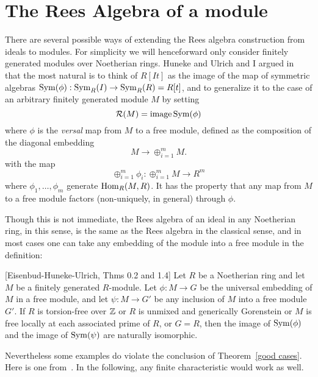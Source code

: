 \documentclass[twoside,12pt, leqno]{amsart}
\def\image{{\rm image}}
\def\RR{{\mathcal R}}
\begin{document}
\section{The Rees Algebra of a module} There are several possible ways of extending the Rees algebra construction from ideals to modules. For simplicity we will henceforward only consider finitely generated modules
over Noetherian rings. Huneke and Ulrich and I argued in~\cite{EHU} that the most natural is
to think of $R[It]$ as the image of the map of symmetric algebras
$\operatorname{Sym}(\phi): \operatorname{Sym}_R(I) \to \operatorname{Sym}_R(R) = R[t]$, and to generalize it to the case of
an arbitrary finitely generated module $M$ by setting
$$
\RR(M) = \image \Sym(\phi)
$$ 
where $\phi$ is the \emph{versal} map from $M$ to a free module, defined as 
the composition of 
the diagonal 
embedding 
$$
M \to \oplus_{i=1}^m M.
$$
with the map
$$
\oplus_{i=1}^m\phi_i: \oplus_{i=1}^mM \to R^{m}
$$ 
where
$\phi_1,\dots, \phi_m$ generate $\operatorname{Hom}_R(M,R)$.
It has the property that any map from $M$ to a free module factors (non-uniquely, in general) through $\phi$. 

Though this is not immediate, the Rees algebra of an ideal in any Noetherian ring, in this sense,
 is the same as the Rees algebra in the classical sense, and in most cases one can take
 any embedding of the module into a free module in the definition:
 
\begin{theorem}\label{good cases} [Eisenbud-Huneke-Ulrich, Thms 0.2 and 1.4] Let $R$ be a Noetherian ring
     and let $M$ be a finitely generated $R$-module. Let $\phi: M \to G$
     be the universal embedding of $M$ in a free module, and let
     $\psi: M \to G'$  be any inclusion of $M$ into a free module $G'$. 
     If $R$ is torsion-free over ${\mathbb Z}$
     or $R$ is unmixed and generically Gorenstein or $M$ is free locally
     at each associated prime of $R$, or $G=R$, then the image of $\operatorname{Sym}(\phi)$ and the
     image of $\operatorname{Sym}(\psi)$ are naturally isomorphic.
\end{theorem}

Nevertheless some examples do violate the conclusion of Theorem~\ref{good cases}. Here is one from~\cite{EHU}.
     In the following, any finite characteristic would work as well.
     
\end{document}
